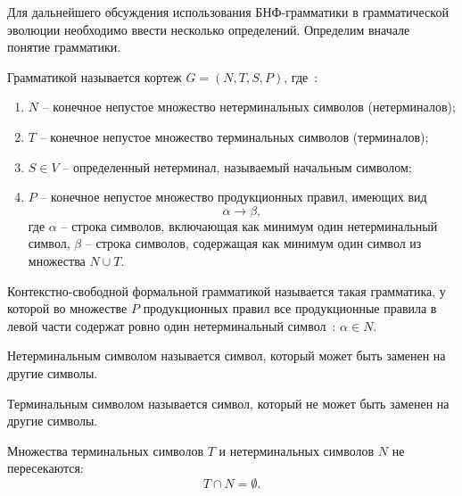 Для дальнейшего обсуждения использования БНФ-грамматики в грамматической эволюции необходимо ввести несколько определений.
Определим вначале понятие грамматики.

\begin{definition}
    Грамматикой называется кортеж $G = \left(N, T, S, P\right)$, где~\cite{JiaLiRaRe1998}:
    \begin{enumerate}
        \item $N$ -- конечное непустое множество нетерминальных символов (нетерминалов);
        \item $T$ -- конечное непустое множество терминальных символов (терминалов);
        \item $S \in V$ -- определенный нетерминал, называемый начальным символом;
        \item $P$ -- конечное непустое множество продукционных правил, имеющих вид
        \begin{equation*}
            \alpha \to \beta,
        \end{equation*}
        где $\alpha$ -- строка символов, включающая как минимум один нетерминальный символ, $\beta$ -- строка символов, содержащая как минимум один символ из множества $N \cup T$.
    \end{enumerate}
    \label{ge:def:grammar}
\end{definition}

\begin{definition}
    Контекстно-свободной формальной грамматикой называется такая грамматика, у которой во множестве $P$ продукционных правил все продукционные правила в левой части содержат ровно один нетерминальный символ~\cite{JiaLiRaRe1998}: $\alpha \in N$.
    \label{ge:def:cffg}
\end{definition}

\begin{definition}
    Нетерминальным символом называется символ, который может быть заменен на другие символы.
\end{definition}

\begin{definition}
    Терминальным символом называется символ, который не может быть заменен на другие символы.
\end{definition}

Множества терминальных символов $T$ и нетерминальных символов $N$ не пересекаются:
\begin{equation}
    T \cap N = \emptyset.
\end{equation}

